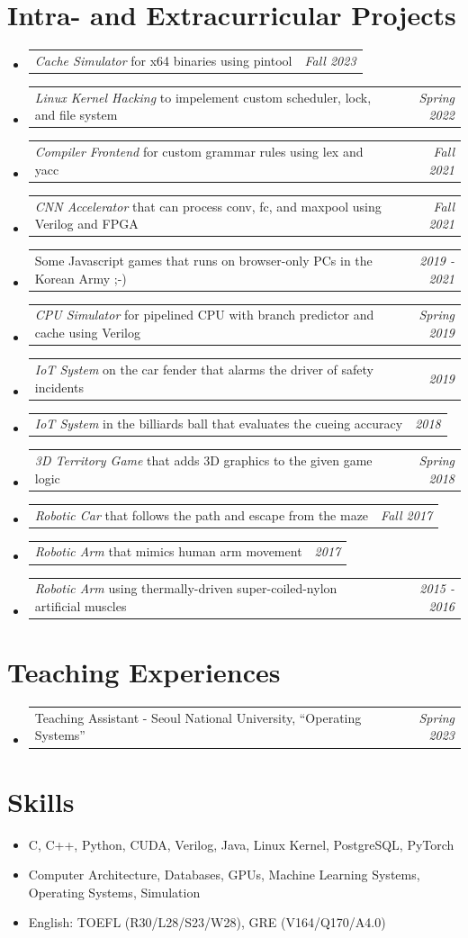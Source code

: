 \documentclass[a4paper]{article}
\makeatletter
\newcommand{\resumeSubheadingSimple}[2]{
  \vspace{-1pt}\item
	\begin{tabular*}{0.97\textwidth}{l@{\extracolsep{\fill}}r}
	  #1 & \textit{#2} \\
	\end{tabular*}
  \vspace{-1pt}
}
\newcommand{\resumeSubheadingVerySimple}[1]{
	\vspace{-1pt}\item #1
	\vspace{-1pt}
}
\newcommand{\resumeSubHeadingListStart}{\begin{itemize}[leftmargin=*]}
\newcommand{\resumeSubHeadingListEnd}{\end{itemize}}
\makeatother
\begin{document}
\section{Intra- and Extracurricular Projects}
\resumeSubHeadingListStart
	\resumeSubheadingSimple{
		\textit{Cache Simulator} for x64 binaries using pintool
	}{Fall 2023}
	\resumeSubheadingSimple{
		\textit{Linux Kernel Hacking} to impelement custom scheduler, lock, and file system
	}{Spring 2022}
	\resumeSubheadingSimple{
		\textit{Compiler Frontend} for custom grammar rules using lex and yacc
	}{Fall 2021}
	\resumeSubheadingSimple{
		\textit{CNN Accelerator} that can process conv, fc, and maxpool using Verilog and FPGA
	}{Fall 2021}
	\resumeSubheadingSimple{
		Some Javascript games that runs on browser-only PCs in the Korean Army ;-)
	}{2019 - 2021}
	\resumeSubheadingSimple{
		\textit{CPU Simulator} for pipelined CPU with branch predictor and cache using Verilog
	}{Spring 2019}
	\resumeSubheadingSimple{
		\textit{IoT System} on the car fender that alarms the driver of safety incidents
	}{2019}
	\resumeSubheadingSimple{
		\textit{IoT System} in the billiards ball that evaluates the cueing accuracy
	}{2018}
	\resumeSubheadingSimple{
		\textit{3D Territory Game} that adds 3D graphics to the given game logic
	}{Spring 2018}
	\resumeSubheadingSimple{
		\textit{Robotic Car} that follows the path and escape from the maze
	}{Fall 2017}
	\resumeSubheadingSimple{
		\textit{Robotic Arm} that mimics human arm movement
	}{2017}
	\resumeSubheadingSimple{
		\textit{Robotic Arm} using thermally-driven super-coiled-nylon artificial muscles
	}{2015 - 2016}
\resumeSubHeadingListEnd

\section{Teaching Experiences}
\resumeSubHeadingListStart
	\resumeSubheadingSimple{
		Teaching Assistant - Seoul National University, ``Operating Systems''
	}{Spring 2023}
\resumeSubHeadingListEnd

\section{Skills}
\resumeSubHeadingListStart
	\resumeSubheadingVerySimple{
		C, C++, Python, CUDA, Verilog, Java, Linux Kernel, PostgreSQL, PyTorch
	}
	\resumeSubheadingVerySimple{
		Computer Architecture, Databases, GPUs, Machine Learning Systems, Operating Systems, Simulation
	}
	\resumeSubheadingVerySimple{
		English: TOEFL (R30/L28/S23/W28), GRE (V164/Q170/A4.0)
	}
\resumeSubHeadingListEnd
\end{document}
